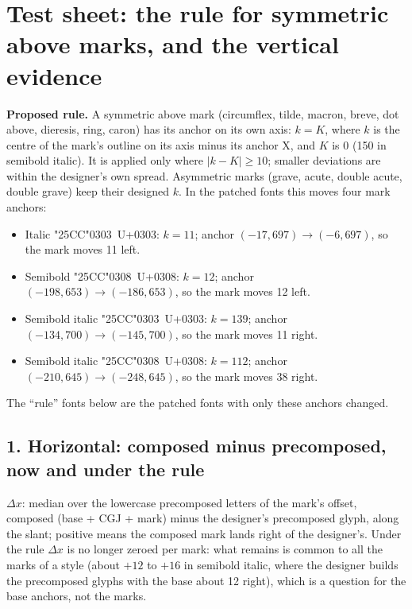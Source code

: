\documentclass[10pt]{article}
\begin{document}
\section*{Test sheet: the rule for symmetric above marks, and the vertical evidence}

\textbf{Proposed rule.} A symmetric above mark (circumflex, tilde, macron, breve, dot above, dieresis, ring, caron) has its anchor on its own axis:
$k = K$, where $k$ is the centre of the mark's outline on its axis minus its anchor X, and $K$ is 0 (150 in semibold italic).
It is applied only where $|k - K| \ge 10$; smaller deviations are within the designer's own spread.
Asymmetric marks (grave, acute, double acute, double grave) keep their designed $k$.
In the patched fonts this moves four mark anchors:

\begin{itemize}
\item Italic \char"25CC\char"0303\ U+0303: $k = 11$; anchor $(-17, 697) \to (-6, 697)$, so the mark moves 11 left.
\item Semibold \char"25CC\char"0308\ U+0308: $k = 12$; anchor $(-198, 653) \to (-186, 653)$, so the mark moves 12 left.
\item Semibold italic \char"25CC\char"0303\ U+0303: $k = 139$; anchor $(-134, 700) \to (-145, 700)$, so the mark moves 11 right.
\item Semibold italic \char"25CC\char"0308\ U+0308: $k = 112$; anchor $(-210, 645) \to (-248, 645)$, so the mark moves 38 right.
\end{itemize}
The ``rule'' fonts below are the patched fonts with only these anchors changed.

\subsection*{1. Horizontal: composed minus precomposed, now and under the rule}
$\Delta x$: median over the lowercase precomposed letters of the mark's offset, composed (base + CGJ + mark) minus the designer's precomposed glyph, along the slant;
positive means the composed mark lands right of the designer's.
Under the rule $\Delta x$ is no longer zeroed per mark: what remains is common to all the marks of a style (about $+12$ to $+16$ in semibold italic, where the designer builds the precomposed glyphs with the base about 12 right), which is a question for the base anchors, not the marks.
\end{document}
